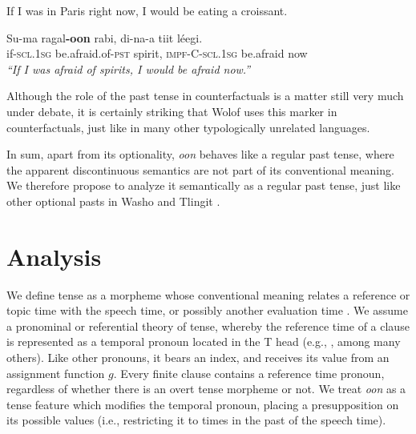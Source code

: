 \documentclass[output=paper
,modfonts
,nonflat]{langsci/langscibook}
\begin{document}
\ea\label{paris} 
If I was in Paris right now, I would be eating a croissant. 
\z

\ea\label{counterfact}
\gll Su-ma ragal\textbf{-oon} rabi, di-na-a tiit l\'eegi.\\
if-\textsc{scl.1sg} be.afraid.of-\textsc{pst} spirit,
\textsc{impf-C-scl.1sg} be.afraid now\\
\glt \textit{``If I was afraid of spirits, I would be afraid now.''}
\z

Although the role of the past tense in counterfactuals is a matter still very much under debate, it is certainly striking that Wolof uses this marker in counterfactuals, just like in many other typologically unrelated languages.

In sum, apart from its optionality, \textit{oon} behaves like a regular past tense, where the apparent discontinuous semantics are not part of its conventional meaning. We therefore propose to analyze it semantically as a regular past tense, just like other optional pasts in Washo \citep{bochnak16past} and Tlingit \citep{cable16implicatures}.




\section{Analysis}

We define tense as a morpheme whose conventional meaning relates a reference or topic time with the speech time, or possibly another evaluation time \citep{reichenbach47tenses, klein94time}. We assume a pronominal or referential theory of tense, whereby the reference time of a clause is represented as a temporal pronoun located in the T head (e.g., \citealt{abusch97sequence, heim94comments, partee73some}, among many others). Like other pronouns, it bears an index, and receives its value from an assignment function $g$. Every finite clause contains a reference time pronoun, regardless of whether there is an overt tense morpheme or not. We treat \textit{oon} as a tense feature which modifies the temporal pronoun, placing a presupposition on its possible values (i.e., restricting it to times in the past of the speech time).
\end{document}
